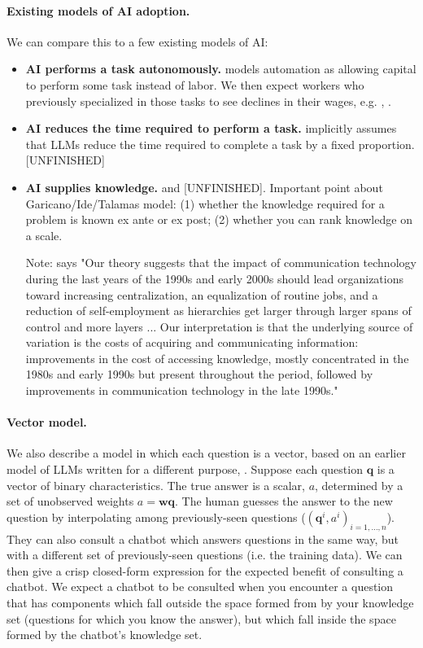 \documentclass[\ifdraft draft\fi]{article}
\begin{document}
   \paragraph{Existing models of AI adoption.} We can compare this to a few existing models of AI:
   \begin{itemize} 
      \item \textbf{AI performs a task autonomously.} \cite{zeira1998workers} models automation as allowing capital to perform some task instead of labor. We then expect workers who previously specialized in those tasks to see declines in their wages, e.g. \cite{acemoglu2011handbook}, \cite{acemoglu2018race}.
      \item \textbf{AI reduces the time required to perform a task.} \cite{eloundou2023gpts} implicitly assumes that LLMs reduce the time required to complete a task by a fixed proportion.[UNFINISHED]
      \item \textbf{AI supplies knowledge.} \citet{ide2024artificialintelligenceknowledgeeconomy} and \citet{autor2025expertise} [UNFINISHED]. Important point about Garicano/Ide/Talamas model: (1) whether the knowledge required for a problem is known ex ante or ex post; (2) whether you can rank knowledge on a scale.
      
         Note: \citet{garicano2006organization} says "Our theory suggests that the impact of communication technology during the last years of the 1990s and early 2000s should lead organizations toward increasing centralization, an equalization of routine jobs, and a reduction of self-employment as hierarchies get larger through larger spans of control and more layers ... Our interpretation is that the underlying source of variation is the costs of acquiring and communicating information: improvements in the cost of accessing knowledge, mostly concentrated in the 1980s and early 1990s but present throughout the period, followed by improvements in communication technology in the late 1990s."
   \end{itemize} 

   


   \paragraph{Vector model.} We also describe a model in which each question is a vector, based on an earlier model of LLMs written for a different purpose, \citet{cunningham2023imitation}. Suppose each question $\bm{q}$ is a vector of binary characteristics. The true answer is a scalar, $a$, determined by a set of unobserved weights $a=\bm{w}\bm{q}$. The human guesses the answer to the new question by interpolating among previously-seen questions ($(\bm{q}^i,a^i)_{i=1,\ldots,n}$). They can also consult a chatbot which answers questions in the same way, but with a different set of previously-seen questions (i.e. the training data). We can then give a crisp closed-form expression for the expected benefit of consulting a chatbot. We expect a chatbot to be consulted when you encounter a question that has components which fall outside the space formed from by your knowledge set (questions for which you know the answer), but which fall inside the space formed by the chatbot's knowledge set.
\end{document}
